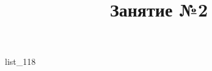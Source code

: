 \documentclass[12pt, a4paper]{article}
\begin{document}
	\title{Занятие №2}
	{list_118}
\end{document}
